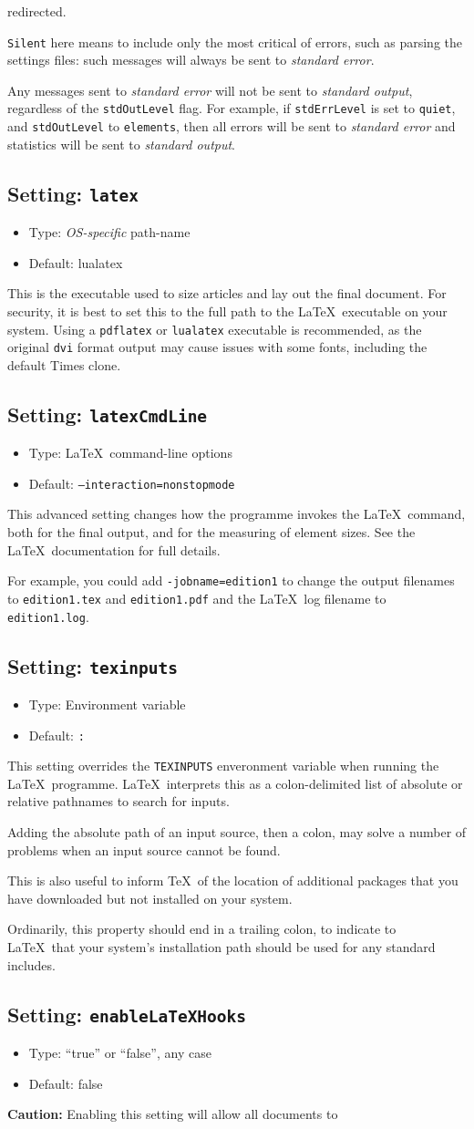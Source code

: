 \documentclass[a4paper,DIV=11]{scrartcl}
\newcommand{\property}[5]{
  \subsection{#1: \texttt{#2}}
  \begin{itemize}
  \item Type: #3
  \item Default: #4
  \end{itemize}
  #5
}
\newcommand{\setting}{\property{Setting}}
\begin{document}
\begin{multicols}{2}
{  redirected.\par
  \texttt{Silent} here means to include only the most critical of
  errors, such as parsing the settings files: such messages will
  always be sent to \textit{standard error}. \par
  Any messages sent to \textit{standard error} will not be sent to
  \textit{standard output}, regardless of the \texttt{stdOutLevel}
  flag. For example, if \texttt{stdErrLevel} is set to
  \texttt{quiet}, and \texttt{stdOutLevel} to \texttt{elements}, then
  all errors will be sent to \textit{standard error} and statistics
  will be sent to \textit{standard output}.
}
\setting{latex}{\textit{OS-specific} path-name}{lualatex}{This is the executable used to
  size articles and lay out the final document. For security, it is
  best to set this to the full path to the \LaTeX\ executable on your
  system. Using a \texttt{pdflatex} or \texttt{lualatex} executable is
  recommended, as the original \texttt{dvi} format output may cause
  issues with some fonts, including the default Times clone.}
\setting{latexCmdLine}{\LaTeX\ command-line options}{\texttt{--interaction=nonstopmode}}{
  This advanced setting changes how the programme invokes the
  \LaTeX\ command, both for the final output, and for the measuring of
  element sizes. See the \LaTeX\ documentation for full details.\par
  For example, you could add \texttt{-jobname=edition1} to change the
  output filenames to \texttt{edition1.tex} and \texttt{edition1.pdf} and
  the \LaTeX\ log filename to \texttt{edition1.log}.
}
\setting{texinputs}{Environment variable}{\texttt{:}}{This setting
  overrides the \texttt{TEXINPUTS} enveronment variable when running
  the \LaTeX\ programme. \LaTeX\ interprets this as a colon-delimited
  list of absolute or relative pathnames to search for inputs.\par
  Adding the absolute path of an input source, then a colon, may solve a number of
  problems when an input source cannot be found.\par
  This is also useful to inform \TeX\ of the location of additional
  packages that you have downloaded but not installed on your system.\par
  Ordinarily, this property should end in a trailing colon, to
  indicate to \LaTeX\ that your system's installation path should be
  used for any standard includes.\par
}
\setting{enableLaTeXHooks}{``true'' or ``false'', any case}{false}{
  \textbf{Caution:} Enabling this setting will allow all documents to
}
\end{multicols}
\end{document}
